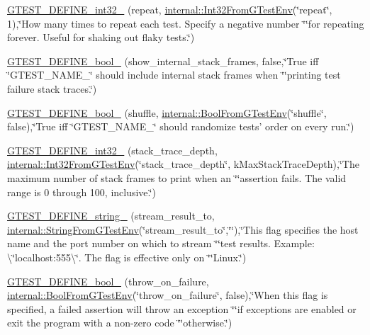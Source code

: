 \begin{DoxyCompactItemize}
\item 
\hyperlink{namespacetesting_a8b2c1dad0764e0984486bae49a988f0e}{G\-T\-E\-S\-T\-\_\-\-D\-E\-F\-I\-N\-E\-\_\-int32\-\_\-} (repeat, \hyperlink{namespacetesting_1_1internal_ac2ea500678b361ecd2c03e4b02bb2ccf}{internal\-::\-Int32\-From\-G\-Test\-Env}(\char`\"{}repeat\char`\"{}, 1),\char`\"{}How many times to repeat each test.  Specify a negative number \char`\"{}\char`\"{}for repeating forever.  Useful for shaking out flaky tests.\char`\"{})
\item 
\hyperlink{namespacetesting_a5982e64522de6804cbf5d1732fd62751}{G\-T\-E\-S\-T\-\_\-\-D\-E\-F\-I\-N\-E\-\_\-bool\-\_\-} (show\-\_\-internal\-\_\-stack\-\_\-frames, false,\char`\"{}True iff \char`\"{}G\-T\-E\-S\-T\-\_\-\-N\-A\-M\-E\-\_\-\char`\"{} should include internal stack frames when \char`\"{}\char`\"{}printing test failure stack traces.\char`\"{})
\item 
\hyperlink{namespacetesting_acc11444cd1c18500658a35e02d4f2cf9}{G\-T\-E\-S\-T\-\_\-\-D\-E\-F\-I\-N\-E\-\_\-bool\-\_\-} (shuffle, \hyperlink{namespacetesting_1_1internal_a1055088bb9b867e1b7b8f096f519d7c5}{internal\-::\-Bool\-From\-G\-Test\-Env}(\char`\"{}shuffle\char`\"{}, false),\char`\"{}True iff \char`\"{}G\-T\-E\-S\-T\-\_\-\-N\-A\-M\-E\-\_\-\char`\"{} should randomize tests' order on every run.\char`\"{})
\item 
\hyperlink{namespacetesting_aaedd7015b957f3c37662c289b645e7d9}{G\-T\-E\-S\-T\-\_\-\-D\-E\-F\-I\-N\-E\-\_\-int32\-\_\-} (stack\-\_\-trace\-\_\-depth, \hyperlink{namespacetesting_1_1internal_ac2ea500678b361ecd2c03e4b02bb2ccf}{internal\-::\-Int32\-From\-G\-Test\-Env}(\char`\"{}stack\-\_\-trace\-\_\-depth\char`\"{}, k\-Max\-Stack\-Trace\-Depth),\char`\"{}The maximum number of stack frames to print when an \char`\"{}\char`\"{}assertion fails.  The valid range is 0 through 100, inclusive.\char`\"{})
\item 
\hyperlink{namespacetesting_a0422a6f971513cf559a8575a0533b235}{G\-T\-E\-S\-T\-\_\-\-D\-E\-F\-I\-N\-E\-\_\-string\-\_\-} (stream\-\_\-result\-\_\-to, \hyperlink{namespacetesting_1_1internal_a0967cbf18fb1594f82512d8d822aba21}{internal\-::\-String\-From\-G\-Test\-Env}(\char`\"{}stream\-\_\-result\-\_\-to\char`\"{},\char`\"{}\char`\"{}),\char`\"{}This flag specifies the host name and the port number on which to stream \char`\"{}\char`\"{}test results. Example\-: \textbackslash{}\char`\"{}localhost\-:555\textbackslash{}\char`\"{}. The flag is effective only on \char`\"{}\char`\"{}Linux.\char`\"{})
\item 
\hyperlink{namespacetesting_a05ff4385edff6d44f6823f5eade7abe2}{G\-T\-E\-S\-T\-\_\-\-D\-E\-F\-I\-N\-E\-\_\-bool\-\_\-} (throw\-\_\-on\-\_\-failure, \hyperlink{namespacetesting_1_1internal_a1055088bb9b867e1b7b8f096f519d7c5}{internal\-::\-Bool\-From\-G\-Test\-Env}(\char`\"{}throw\-\_\-on\-\_\-failure\char`\"{}, false),\char`\"{}When this flag is specified, a failed assertion will throw an exception \char`\"{}\char`\"{}if exceptions are enabled or exit the program with a non-\/zero code \char`\"{}\char`\"{}otherwise.\char`\"{})

\end{DoxyCompactItemize}
